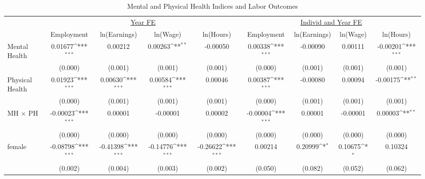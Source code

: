 \documentclass[border=3mm,preview]{standalone}
\begin{document}
\begin{landscape}
\def\sym#1{\ifmmode^{#1}\else\(^{#1}\)\fi}
\begin{table}
\center\caption*{Mental and Physical Health Indices and Labor Outcomes}
\footnotesize
\begin{tabular}{l*{8}{c}}
                    &\multicolumn{4}{c}{\underline{Year FE}}                                                &\multicolumn{4}{c}{\underline{Individ and Year FE}}                                    \\\cmidrule(lr){2-5}\cmidrule(lr){6-9}
                    &\multicolumn{1}{c}{Employment}&\multicolumn{1}{c}{ln(Earnings)}&\multicolumn{1}{c}{ln(Wage)}&\multicolumn{1}{c}{ln(Hours)}&\multicolumn{1}{c}{Employment}&\multicolumn{1}{c}{ln(Earnings)}&\multicolumn{1}{c}{ln(Wage)}&\multicolumn{1}{c}{ln(Hours)}\\
\toprule
Mental Health       &     0.01677\sym{***}&     0.00212         &     0.00263\sym{**} &    -0.00050         &     0.00338\sym{***}&    -0.00090         &     0.00111         &    -0.00201\sym{***}\\
                    &     (0.000)         &     (0.001)         &     (0.001)         &     (0.001)         &     (0.000)         &     (0.001)         &     (0.001)         &     (0.001)         \\
Physical Health     &     0.01923\sym{***}&     0.00630\sym{***}&     0.00584\sym{***}&     0.00046         &     0.00387\sym{***}&    -0.00080         &     0.00094         &    -0.00175\sym{**} \\
                    &     (0.000)         &     (0.001)         &     (0.001)         &     (0.001)         &     (0.000)         &     (0.001)         &     (0.001)         &     (0.001)         \\
MH $\times$ PH      &    -0.00023\sym{***}&     0.00001         &    -0.00001         &     0.00002         &    -0.00004\sym{***}&     0.00001         &    -0.00001         &     0.00003\sym{**} \\
                    &     (0.000)         &     (0.000)         &     (0.000)         &     (0.000)         &     (0.000)         &     (0.000)         &     (0.000)         &     (0.000)         \\
\midrule
female              &    -0.08798\sym{***}&    -0.41398\sym{***}&    -0.14776\sym{***}&    -0.26622\sym{***}&     0.00214         &     0.20999\sym{*}  &     0.10675\sym{*}  &     0.10324         \\
                    &     (0.002)         &     (0.004)         &     (0.003)         &     (0.002)         &     (0.050)         &     (0.082)         &     (0.052)         &     (0.062)         \\

\end{tabular}
\end{table}
\end{landscape}
\end{document}
